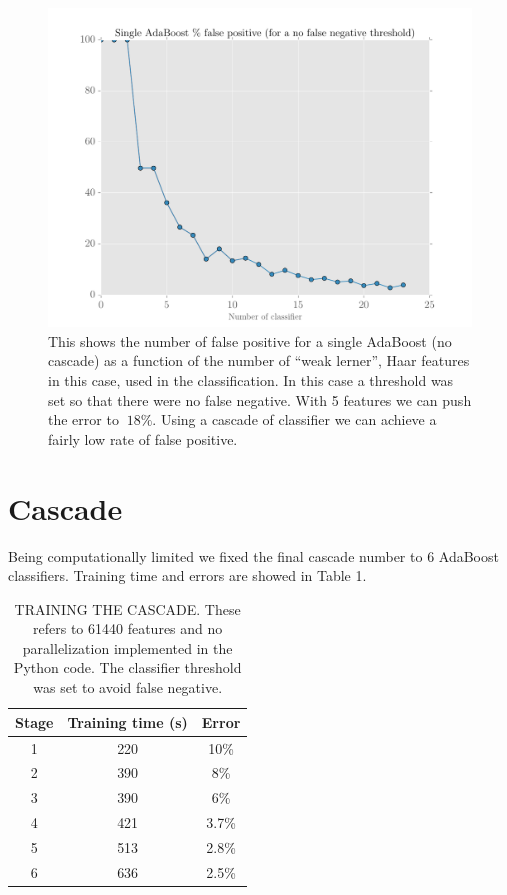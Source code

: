 \documentclass[11pt]{amsart}
\begin{document}
\begin{figure}[htbp]
\begin{center}
\includegraphics[scale=0.5]{single_ada_false_pos2.pdf}
\caption{This shows the number of false positive for a single AdaBoost (no cascade) as a function of the number of ``weak lerner'', Haar features in this case, used in the classification. In this case a threshold was set so that there were no false negative. With 5 features we can push the error to $~18\%$. Using a cascade of classifier we can achieve a fairly low rate of false positive.}
\label{default}
\end{center}
\end{figure}



\section{Cascade}
Being computationally limited we fixed the final cascade number to 6 AdaBoost classifiers.
Training time and errors are showed in Table 1.
\begin{table}[htbp]
\caption{TRAINING THE CASCADE. These refers to 61440 features and no parallelization implemented in the Python code. The classifier threshold was set to avoid false negative.}\begin{center}
\begin{tabular}{|c|c|c|}
\hline
Stage & Training time (s)& Error \\
\hline
1&220&10\%\\ 
\hline
2&390&8\%\\ 
\hline
3&390&6\%\\ 
\hline
4&421&3.7\%\\ 
\hline
5&513&2.8\%\\ 
\hline
6&636&2.5\%\\ 
\hline
\end{tabular}
\end{center}
\end{table}%
\end{document}
